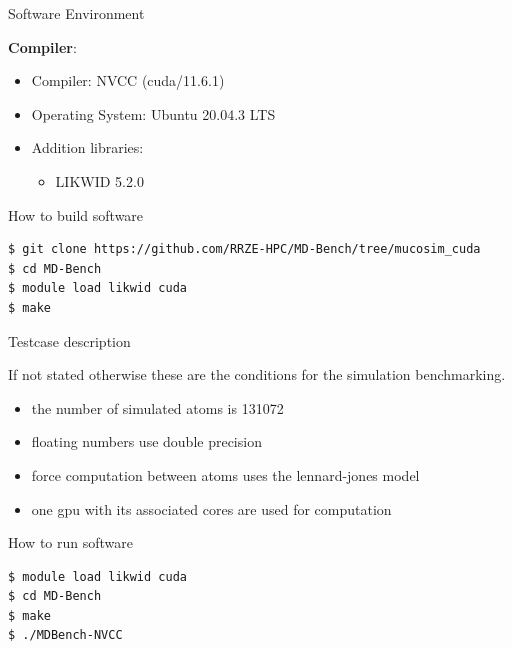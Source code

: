 \documentclass[ignorenonframetext,]{beamer}
\providecommand{\tightlist}{%
  \setlength{\itemsep}{0pt}\setlength{\parskip}{0pt}}
\begin{document}
\begin{frame}[fragile]

\begin{block}{Software Environment}

\textbf{Compiler}:

\begin{itemize}
\tightlist
\item
  Compiler: NVCC (cuda/11.6.1)
\item
  Operating System: Ubuntu 20.04.3 LTS
\item
  Addition libraries:

  \begin{itemize}
  \tightlist
  \item
    LIKWID 5.2.0
  \end{itemize}
\end{itemize}

\end{block}

\begin{block}{How to build software}

\begin{verbatim}
$ git clone https://github.com/RRZE-HPC/MD-Bench/tree/mucosim_cuda
$ cd MD-Bench
$ module load likwid cuda
$ make
\end{verbatim}

\end{block}

\end{frame}

\begin{frame}[fragile]

\begin{block}{Testcase description}

If not stated otherwise these are the conditions for the simulation
benchmarking.

\begin{itemize}
\tightlist
\item
  the number of simulated atoms is 131072
\item
  floating numbers use double precision
\item
  force computation between atoms uses the lennard-jones model
\item
  one gpu with its associated cores are used for computation
\end{itemize}

\end{block}

\begin{block}{How to run software}

\begin{verbatim}
$ module load likwid cuda
$ cd MD-Bench
$ make
$ ./MDBench-NVCC
\end{verbatim}

\end{block}

\end{frame}
\end{document}

